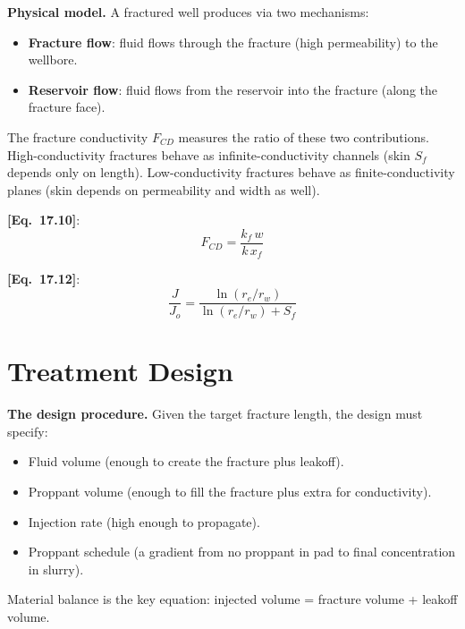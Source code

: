 \documentclass[11pt,a4paper,openany]{book}
\newcommand{\eqrefbook}[1]{\textcolor{blue!60!black}{\textbf{[Eq.~#1]}}}
\begin{document}
\begin{theory}
\textbf{Physical model.} A fractured well produces via two mechanisms:
\begin{itemize}
  \item \textbf{Fracture flow}: fluid flows through the fracture
        (high permeability) to the wellbore.
  \item \textbf{Reservoir flow}: fluid flows from the reservoir
        into the fracture (along the fracture face).
\end{itemize}

The fracture conductivity $F_{CD}$ measures the ratio of these two
contributions. High-conductivity fractures behave as infinite-conductivity
channels (skin $S_f$ depends only on length). Low-conductivity
fractures behave as finite-conductivity planes (skin depends on
permeability and width as well).
\end{theory}

\eqrefbook{17.10}:
\begin{equation}
  F_{CD} = \frac{k_f\,w}{k\,x_f}
\end{equation}

\eqrefbook{17.12}:
\begin{equation}
  \frac{J}{J_o} = \frac{\ln(r_e/r_w)}
  {\ln(r_e/r_w) + S_f}
\end{equation}

\section{Treatment Design}

\begin{theory}
\textbf{The design procedure.} Given the target fracture length, the
design must specify:
\begin{itemize}
  \item Fluid volume (enough to create the fracture plus leakoff).
  \item Proppant volume (enough to fill the fracture plus extra for
        conductivity).
  \item Injection rate (high enough to propagate).
  \item Proppant schedule (a gradient from no proppant in pad to final
        concentration in slurry).
\end{itemize}

Material balance is the key equation: injected volume = fracture
volume + leakoff volume.
\end{theory}
\end{document}
